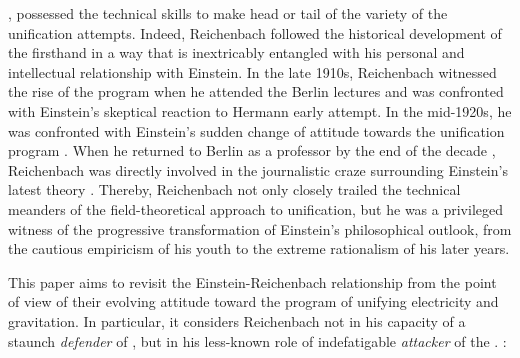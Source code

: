 \documentclass[final]{article}
\begin{document}

, possessed the technical skills to make head or tail of the variety of the unification attempts. Indeed, Reichenbach followed the historical development of the \uftp firsthand in a way that is inextricably entangled with his personal and intellectual relationship with Einstein. In the late 1910s, Reichenbach witnessed  the rise of the program when he attended the Berlin lectures and was confronted with Einstein's skeptical reaction to Hermann  early attempt. In the mid-1920s, he was confronted with Einstein's sudden change of attitude towards the unification program \citep[188]{Vizgin1994}. When he returned to Berlin as a professor by the end of the decade , Reichenbach was directly involved in the journalistic craze surrounding Einstein's latest theory \citep{Sauer2006}. Thereby, Reichenbach not only closely trailed the technical meanders of the field-theoretical approach to unification, but he was a privileged witness of the progressive transformation of Einstein's philosophical outlook, from the cautious empiricism of his youth to the extreme rationalism of his later years. 

This paper aims to revisit the Einstein-Reichenbach relationship from the point of view of their evolving attitude toward the program of unifying electricity and gravitation. In particular, it considers Reichenbach not in his capacity of a staunch \emph{defender} of \rt \citep{Hentschel1982,Reichenbach2006}, but in his less-known role of indefatigable \emph{attacker} of the \uftp. :
\end{document}
